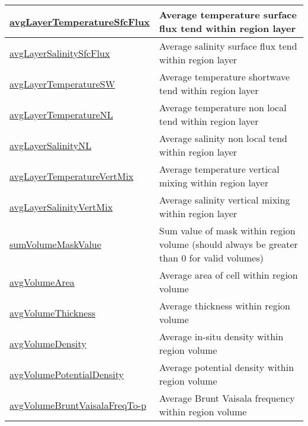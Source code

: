 {\begin{center}
\begin{longtable}{| p{2.0in} | p{4.0in} |}
    \hline
    \hyperref[subsec:var_sec_layerVolumeWeightedAverageAM_avgLayerTemperatureSfcFlux]{avgLayerTemperatureSfcFlux} & Average temperature surface flux tend within region layer \\
    \hline
    \hyperref[subsec:var_sec_layerVolumeWeightedAverageAM_avgLayerSalinitySfcFlux]{avgLayerSalinitySfcFlux} & Average salinity surface flux tend within region layer \\
    \hline
    \hyperref[subsec:var_sec_layerVolumeWeightedAverageAM_avgLayerTemperatureSW]{avgLayerTemperatureSW} & Average temperature shortwave tend within region layer \\
    \hline
    \hyperref[subsec:var_sec_layerVolumeWeightedAverageAM_avgLayerTemperatureNL]{avgLayerTemperatureNL} & Average temperature non local tend within region layer \\
    \hline
    \hyperref[subsec:var_sec_layerVolumeWeightedAverageAM_avgLayerSalinityNL]{avgLayerSalinityNL} & Average salinity non local tend within region layer \\
    \hline
    \hyperref[subsec:var_sec_layerVolumeWeightedAverageAM_avgLayerTemperatureVertMix]{avgLayerTemperatureVertMix} & Average temperature vertical mixing within region layer \\
    \hline
    \hyperref[subsec:var_sec_layerVolumeWeightedAverageAM_avgLayerSalinityVertMix]{avgLayerSalinityVertMix} & Average salinity vertical mixing within region layer \\
    \hline
    \hyperref[subsec:var_sec_layerVolumeWeightedAverageAM_sumVolumeMaskValue]{sumVolumeMaskValue} & Sum value of mask within region volume (should always be greater than 0 for valid volumes) \\
    \hline
    \hyperref[subsec:var_sec_layerVolumeWeightedAverageAM_avgVolumeArea]{avgVolumeArea} & Average area of cell within region volume \\
    \hline
    \hyperref[subsec:var_sec_layerVolumeWeightedAverageAM_avgVolumeThickness]{avgVolumeThickness} & Average thickness within region volume \\
    \hline
    \hyperref[subsec:var_sec_layerVolumeWeightedAverageAM_avgVolumeDensity]{avgVolumeDensity} & Average in-situ density within region volume \\
    \hline
    \hyperref[subsec:var_sec_layerVolumeWeightedAverageAM_avgVolumePotentialDensity]{avgVolumePotentialDensity} & Average potential density within region volume \\
    \hline
    \hyperref[subsec:var_sec_layerVolumeWeightedAverageAM_avgVolumeBruntVaisalaFreqTop]{avgVolumeBruntVaisalaFreqTo-}\hyperref[subsec:var_sec_layerVolumeWeightedAverageAM_avgVolumeBruntVaisalaFreqTop]{p}  & Average Brunt Vaisala frequency within region volume \\

\end{longtable}
\end{center}}
